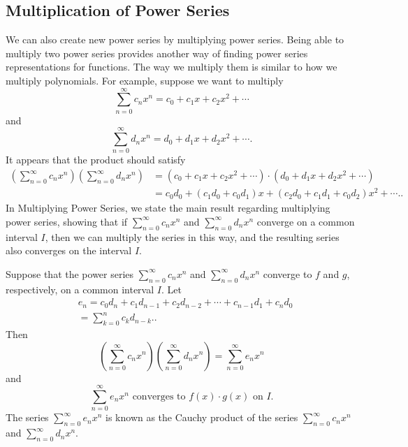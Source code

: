 \documentclass{report}
\begin{document}
    \subsection*{Multiplication of Power Series}
    \bigbreak \noindent 
    We can also create new power series by multiplying power series. Being able to multiply two power series provides another way of finding power series representations for functions.
    \bigbreak \noindent 
    The way we multiply them is similar to how we multiply polynomials. For example, suppose we want to multiply
    \[
    \sum_{n=0}^{\infty} c_n x^n = c_0 + c_1 x + c_2 x^2 + \cdots
    \]
    and
    \[
    \sum_{n=0}^{\infty} d_n x^n = d_0 + d_1 x + d_2 x^2 + \cdots.
    \]
    It appears that the product should satisfy
    \begin{align*}
        \left( \sum_{n=0}^{\infty} c_n x^n \right) \left( \sum_{n=0}^{\infty} d_n x^n \right) &= (c_0 + c_1 x + c_2 x^2 + \cdots) \cdot (d_0 + d_1 x + d_2 x^2 + \cdots)  \\
        &= c_0 d_0 + (c_1 d_0 + c_0 d_1) x + (c_2 d_0 + c_1 d_1 + c_0 d_2) x^2 + \cdots.
    .\end{align*}
    In Multiplying Power Series, we state the main result regarding multiplying power series, showing that if \(\sum_{n=0}^{\infty} c_n x^n\) and \(\sum_{n=0}^{\infty} d_n x^n\) converge on a common interval \(I\), then we can multiply the series in this way, and the resulting series also converges on the interval \(I\).
    \pagebreak \bigbreak \noindent 
    \begin{thrm}
        Suppose that the power series \(\sum_{n=0}^{\infty} c_n x^n\) and \(\sum_{n=0}^{\infty} d_n x^n\) converge to \(f\) and \(g\), respectively, on a common interval \(I\). Let
        \begin{align*}
            &e_n = c_0 d_n + c_1 d_{n-1} + c_2 d_{n-2} + \cdots + c_{n-1} d_1 + c_n d_0  \\
            &= \sum_{k=0}^{n} c_k d_{n-k}.
        .\end{align*}
        Then
        \[
        \left( \sum_{n=0}^{\infty} c_n x^n \right) \left( \sum_{n=0}^{\infty} d_n x^n \right) = \sum_{n=0}^{\infty} e_n x^n
        \]
        and
        \[
        \sum_{n=0}^{\infty} e_n x^n \text{ converges to } f(x) \cdot g(x) \text{ on } I.
        \]
        The series \(\sum_{n=0}^{\infty} e_n x^n\) is known as the Cauchy product of the series \(\sum_{n=0}^{\infty} c_n x^n\) and \(\sum_{n=0}^{\infty} d_n x^n\).
    \end{thrm}
\end{document}
